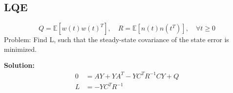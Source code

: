 \subsection{LQE}
$$
    Q = \mathbb{E}[w(t)w(t)^T], \quad R = \mathbb{E}[n(t)n(t^T)], \quad \forall t\geq 0
$$
Problem: Find L, such that the steady-state covariance of the state error is minimized.

\textbf{Solution:}
\begin{align*}
    0 &= AY + YA^T - YC^TR^{-1}CY + Q\\
    L &= -YC^TR^{-1}
\end{align*}